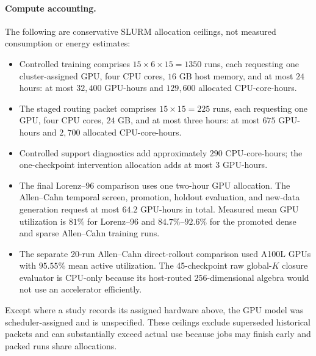 \paragraph{Compute accounting.}
The following are conservative SLURM allocation ceilings, not measured
consumption or energy estimates:
\begin{itemize}
  \item Controlled training comprises \(15\times6\times15=1350\) runs, each
  requesting one cluster-assigned GPU, four CPU cores, \(16\) GB host memory,
  and at most \(24\) hours: at most \(32{,}400\) GPU-hours and \(129{,}600\)
  allocated CPU-core-hours.
  \item The staged routing packet comprises \(15\times15=225\) runs, each
  requesting one GPU, four CPU cores, \(24\) GB, and at most three hours: at
  most \(675\) GPU-hours and \(2{,}700\) allocated CPU-core-hours.
  \item Controlled support diagnostics add approximately \(290\)
  CPU-core-hours; the one-checkpoint intervention allocation adds at most
  \(3\) GPU-hours.
  \item The final Lorenz--96 comparison uses one two-hour GPU allocation.
  The Allen--Cahn temporal screen, promotion, holdout evaluation, and new-data
  generation request at most \(64.2\) GPU-hours in total.  Measured mean GPU
  utilization is \(81\%\) for Lorenz--96 and \(84.7\%\)--\(92.6\%\) for the
  promoted dense and sparse Allen--Cahn training runs.
  \item The separate 20-run Allen--Cahn direct-rollout comparison used A100L
  GPUs with \(95.55\%\) mean active utilization.  The 45-checkpoint raw
  global-\(K\) closure evaluator is CPU-only because its host-routed
  \(256\)-dimensional algebra would not use an accelerator efficiently.
\end{itemize}
Except where a study records its assigned hardware above, the GPU model
was scheduler-assigned and is unspecified.  These
ceilings exclude superseded historical packets and can substantially exceed
actual use because jobs may finish early and packed runs share allocations.
